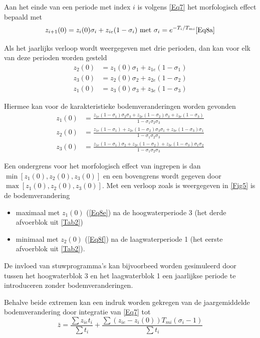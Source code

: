 Aan het einde van een periode met index $i$ is volgens \autoref{Eq7} het morfologisch effect bepaald met
%
\begin{equation}
z_{i+1}(0) = z_i (0) \sigma_i + z_{ie} (1-\sigma_i) \text{ met } \sigma_i = e^{-T_i/T_{mi}}
\autoref{Eq8a}
\end{equation}

Als het jaarlijks verloop wordt weergegeven met drie perioden, dan kan voor elk van deze perioden worden gesteld
%
\begin{align}
z_2(0) &= z_1 (0) \sigma_1 + z_{1e} (1-\sigma_1) \label{Eq8b} \\
z_3(0) &= z_2 (0) \sigma_2 + z_{2e} (1-\sigma_2) \label{Eq8c} \\
z_1(0) &= z_3 (0) \sigma_3 + z_{3e} (1-\sigma_3) \label{Eq8d}
\end{align}

Hiermee kan voor de karakteristieke bodemveranderingen worden gevonden
%
\begin{align}
z_1(0) &= \frac{z_{1e} (1-\sigma_1) \sigma_2 \sigma_3 + z_{2e} (1-\sigma_2) \sigma_3 + z_{3e} (1-\sigma_3)}{1 - \sigma_1 \sigma_2 \sigma_3} \label{Eq8e} \\
z_2(0) &= \frac{z_{1e} (1-\sigma_1) + z_{2e} (1-\sigma_2) \sigma_3 \sigma_1 + z_{3e} (1-\sigma_3) \sigma_1}{1 - \sigma_1 \sigma_2 \sigma_3} \label{Eq8f} \\
z_3(0) &= \frac{z_{1e} (1-\sigma_1) \sigma_2 + z_{2e} (1-\sigma_2) + z_{3e} (1-\sigma_3) \sigma_1 \sigma_2}{1 - \sigma_1 \sigma_2 \sigma_3} \label{Eq8g}
\end{align}

Een ondergrens voor het morfologisch effect van ingrepen is dan $\min[z_1(0), z_2(0), z_3(0)]$ en een bovengrens wordt gegeven door $\max[z_1(0), z_2(0), z_3(0)]$.
Met een verloop zoals is weergegeven in \autoref{Fig5} is de bodemverandering
\begin{itemize}
\item maximaal met $z_1(0)$ (\autoref{Eq8e}) na de hoogwaterperiode 3 (het derde afvoerblok uit \autoref{Tab2})
\item minimaal met $z_2(0)$ (\autoref{Eq8f}) na de laagwaterperiode 1 (het eerste afvoerblok uit \autoref{Tab2}).
\end{itemize}

De invloed van stuwprogramma's kan bijvoorbeed worden gesimuleerd door tussen het hoogwaterblok 3 en het laagwaterblok 1 een jaarlijkse periode te introduceren zonder bodemveranderingen.

Behalve beide extremen kan een indruk worden gekregen van de jaargemiddelde bodemverandering door integratie van \autoref{Eq7} tot
%
\begin{equation}
\bar{z} = \frac{\sum{z_{ie} t_i}}{\sum{t_i}} + \frac{\sum{(z_{ie}-z_i(0)) T_{mi} (\sigma_i-1)}}{\sum{t_i}}
\label{Eq8h}
\end{equation}


